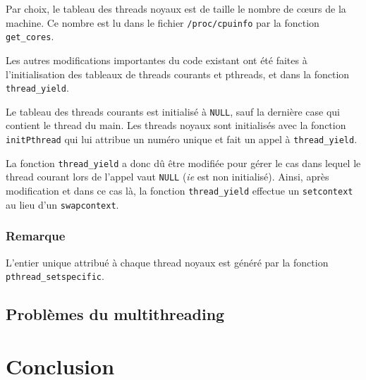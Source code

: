 \documentclass[a4paper,11pt]{article}
\begin{document}
Par choix, le tableau des threads noyaux est de taille le nombre de c\oe urs de la machine. Ce nombre est lu dans le fichier \texttt{/proc/cpuinfo} par la fonction \texttt{get\_cores}.

Les autres modifications importantes du code existant ont été faites à l'initialisation des tableaux de threads courants et pthreads, et dans la fonction \texttt{thread\_yield}.

Le tableau des threads courants est initialisé à \texttt{NULL}, sauf la dernière case qui contient le thread du main. Les threads noyaux sont initialisés avec la fonction \texttt{initPthread} qui lui attribue un numéro unique et fait un appel à \texttt{thread\_yield}.

La fonction \texttt{thread\_yield} a donc dû être modifiée pour gérer le cas dans lequel le thread courant lors de l'appel vaut \texttt{NULL} (\textit{ie} est non initialisé). Ainsi, après modification et dans ce cas là, la fonction \texttt{thread\_yield} effectue un \texttt{setcontext} au lieu d'un \texttt{swapcontext}.

\subsubsection*{Remarque}

L'entier unique attribué à chaque thread noyaux est généré par la fonction \texttt{pthread\_setspecific}.

\subsection{Problèmes du multithreading}




\section*{Conclusion} %
\end{document}
